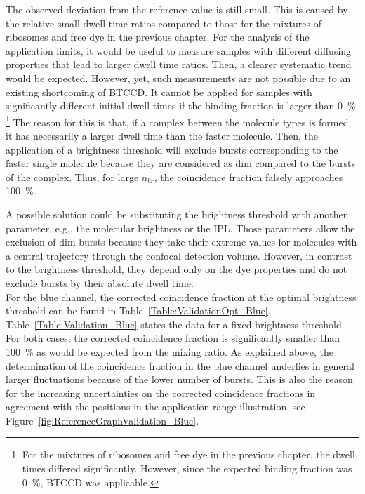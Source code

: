 The observed deviation from the reference value is still small. This is caused by the relative small dwell time ratios compared to those for the mixtures of ribosomes and free dye in the previous chapter. For the analysis of the application limits, it would be useful to measure samples with different diffusing properties that lead to larger dwell time ratios. Then, a clearer systematic trend would be expected. However, yet, such measurements are not possible due to an existing shortcoming of \gls{BTCCD}. It cannot be applied for samples with significantly different initial dwell times if the binding fraction is larger than \SI{0}{\percent}. \footnote{For the mixtures of ribosomes and free dye in the previous chapter, the dwell times differed significantly. However, since the expected binding fraction was \SI{0}{\percent}, \gls{BTCCD} was applicable.} The reason for this is that, if a complex between the molecule types is formed, it has necessarily a larger dwell time than the faster molecule. Then, the application of a brightness threshold will exclude bursts corresponding to the faster single molecule because they are considered as dim compared to the bursts of the complex. Thus, for large $n_{br}$, the coincidence fraction falsely approaches \SI{100}{\percent}. 

A possible solution could be substituting the brightness threshold with another parameter, e.g., the molecular brightness or the \gls{IPL}. Those parameters allow the exclusion of dim bursts because they take their extreme values for molecules with a central trajectory through the confocal detection volume. However, in contrast to the brightness threshold, they depend only on the dye properties and do not exclude bursts by their absolute dwell time. \\

For the blue channel, the corrected coincidence fraction at the optimal brightness threshold can be found in Table~\ref{Table:ValidationOpt_Blue}. Table~\ref{Table:Validation_Blue} states the data for a fixed brightness threshold. For both cases, the corrected coincidence fraction is significantly smaller than \SI{100}{\percent} as would be expected from the mixing ratio. As explained above, the determination of the coincidence fraction in the blue channel underlies in general larger fluctuations because of the lower number of bursts. This is also the reason for the increasing uncertainties on the corrected coincidence fractions in agreement with the positions in the application range illustration, see Figure~\ref{fig:ReferenceGraphValidation_Blue}.